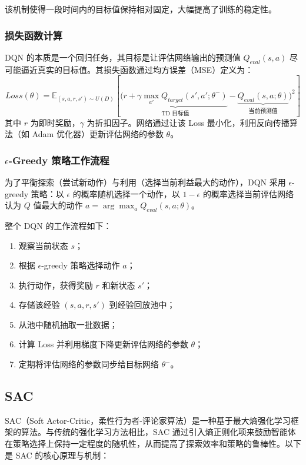 该机制使得一段时间内的目标值保持相对固定，大幅提高了训练的稳定性。

\subsubsection{损失函数计算}
DQN 的本质是一个回归任务，其目标是让评估网络输出的预测值 $Q_{eval}(s, a)$ 尽可能逼近真实的目标值。其损失函数通过均方误差（MSE）定义为：
\begin{equation}
    Loss(\theta) = \mathbb{E}_{(s,a,r,s') \sim U(D)} \left[ \Big( \underbrace{r + \gamma \max_{a'} Q_{target}(s', a'; \theta^-)}_{\text{TD 目标值}} - \underbrace{Q_{eval}(s, a; \theta)}_{\text{当前预测值}} \Big)^2 \right]
\end{equation}
其中 $r$ 为即时奖励，$\gamma$ 为折扣因子。网络通过让该 Loss 最小化，利用反向传播算法（如 Adam 优化器）更新评估网络的参数 $\theta$。

\subsubsection{$\epsilon$-Greedy 策略工作流程}
为了平衡探索（尝试新动作）与利用（选择当前利益最大的动作），DQN 采用 $\epsilon$-greedy 策略：以 $\epsilon$ 的概率随机选择一个动作，以 $1 - \epsilon$ 的概率选择当前评估网络认为 $Q$ 值最大的动作 $a = \arg\max_{a} Q_{eval}(s, a; \theta)$。

整个 DQN 的工作流程如下：
\begin{enumerate}
    \item 观察当前状态 $s$；
    \item 根据 $\epsilon$-greedy 策略选择动作 $a$；
    \item 执行动作，获得奖励 $r$ 和新状态 $s'$；
    \item 存储该经验 $(s, a, r, s')$ 到经验回放池中；
    \item 从池中随机抽取一批数据；
    \item 计算 Loss 并利用梯度下降更新评估网络的参数 $\theta$；
    \item 定期将评估网络的参数同步给目标网络 $\theta^-$。
\end{enumerate}

\subsection{SAC}
SAC（Soft Actor-Critic，柔性行为者-评论家算法）是一种基于最大熵强化学习框架的算法。与传统的强化学习方法相比，SAC 通过引入熵正则化项来鼓励智能体在策略选择上保持一定程度的随机性，从而提高了探索效率和策略的鲁棒性。\cite{yang2023intelligent}以下是 SAC 的核心原理与机制：

